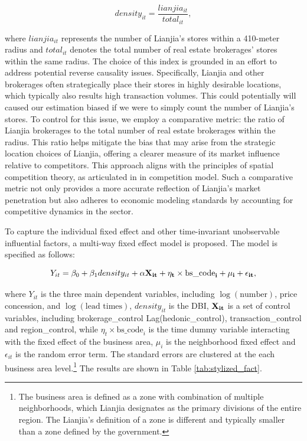 \documentclass[11pt]{article}
\begin{document}
\begin{equation*}
  density_{it} = \frac{lianjia_{it}}{total_{it}},
\end{equation*}

where $lianjia_{it}$ represents the number of Lianjia's stores within a 410-meter radius and $total_{it}$ denotes the total number of real estate brokerages' stores within the same radius. The choice of this index is grounded in an effort to address potential reverse causality issues. Specifically, Lianjia and other brokerages often strategically place their stores in highly desirable locations, which typically also results high transaction volumes. This could potentially will caused our estimation biased if we were to simply count the number of Lianjia's stores. To control for this issue, we employ a comparative metric: the ratio of Lianjia brokerages to the total number of real estate brokerages within the radius. This ratio helps mitigate the bias that may arise from the strategic location choices of Lianjia, offering a clearer measure of its market influence relative to competitors. This approach aligns with the principles of spatial competition theory, as articulated in \citep{hotelling_stability_1929, daspremont_hotellings_1979} in competition model. Such a comparative metric not only provides a more accurate reflection of Lianjia's market penetration but also adheres to economic modeling standards by accounting for competitive dynamics in the sector.

To capture the individual fixed effect and other time-invariant unobservable influential factors, a multi-way fixed effect model is proposed. The model is specified as follows: 

\begin{equation}
  Y_{it} = \beta_0 + \beta_1 density_{it} + \bf{\alpha} \bf{X}_{it} + \eta_{t} \times \text{bs\_code}_i + \mu_i + \epsilon_{it}, \label{eq:multi-way-fe}
\end{equation}

where $Y_{it}$ is the three main dependent variables, including $\log(\text{number})$, price concession, and $\log(\text{lead times})$, $density_{it}$ is the DBI, $\bf{X}_{it}$ is a set of control variables, including brokerage\_control Lag(hedonic\_control), transaction\_control and region\_control, while $\eta_{t} \times \text{bs\_code}_i$ is the time dummy variable interacting with the fixed effect of the business area, $\mu_i$ is the neighborhood fixed effect and $\epsilon_{it}$ is the random error term. The standard errors are clustered at the each business area level.\footnote{The business area is defined as a zone with combination of multiple neighborhoods, which Lianjia designates as the primary divisions of the entire region. The Lianjia's definition of a zone is different and typically smaller than a zone defined by the government.} The results are shown in Table \ref{tab:stylized_fact}.
\end{document}
